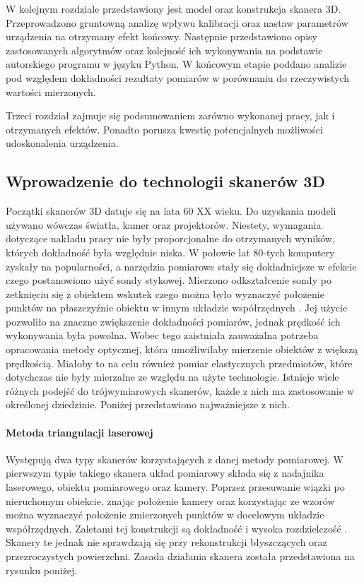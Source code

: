 \documentclass[10pt,twoside]{article}
\begin{document}
W kolejnym rozdziale przedstawiony jest model oraz konstrukcja skanera 3D. Przeprowadzono gruntowną analizę wpływu kalibracji oraz nastaw parametrów urządzenia na otrzymany efekt końcowy. Następnie przedstawiono opisy zastosowanych algorytmów oraz kolejność ich wykonywania na podstawie autorskiego programu w języku Python. W końcowym etapie poddano analizie pod względem dokładności rezultaty pomiarów w porównaniu do rzeczywistych wartości mierzonych.

Trzeci rozdział zajmuje się podsumowaniem zarówno wykonanej pracy, jak i otrzymanych efektów. Ponadto porusza kwestię potencjalnych możliwości udoskonalenia urządzenia.

\subsection{Wprowadzenie do technologii skanerów 3D}

Początki skanerów 3D datuje się na lata 60 XX wieku. Do uzyskania modeli używano wówczas światła, kamer oraz projektorów. Niestety, wymagania dotyczące nakładu pracy nie były proporcjonalne do otrzymanych wyników, których dokładność była względnie niska. W połowie lat 80-tych komputery zyskały na popularności, a narzędzia pomiarowe stały się dokładniejsze w efekcie czego postanowiono użyć sondy stykowej. Mierzono odkształcenie sondy po zetknięciu się z obiektem wskutek czego można było wyznaczyć położenie punktów na płaszczyźnie obiektu w innym układzie współrzędnych \cite{abdel20113d}. Jej użycie pozwoliło na znaczne zwiększenie dokładności pomiarów, jednak prędkość ich wykonywania była powolna. Wobec tego zaistniała zauważalna potrzeba opracowania metody optycznej, która umożliwiłaby mierzenie obiektów z większą prędkością. Miałoby to na celu również pomiar elastycznych przedmiotów, które dotychczas nie były mierzalne ze względu na użyte technologie. Istnieje wiele różnych podejść do trójwymiarowych skanerów, każde z nich ma zastosowanie w określonej dziedzinie. Poniżej przedstawiono najważniejsze z nich.

\paragraph{Metoda triangulacji laserowej\newline}
Występują dwa typy skanerów korzystających z danej metody pomiarowej. W pierwszym typie takiego skanera układ pomiarowy składa się z nadajnika laserowego, obiektu pomiarowego oraz kamery. Poprzez przesuwanie wiązki po nieruchomym obiekcie, znając położenie kamery oraz korzystając ze wzorów \cite{mikulski2013metody} można wyznaczyć położenie zmierzonych punktów w docelowym układzie współrzędnych. Zaletami tej konstrukcji są dokładność i wysoka rozdzielczość \cite{nowacki2018pomiar}. Skanery te jednak nie sprawdzają się przy rekonstrukcji błyszczących oraz przezroczystych powierzchni. Zasada działania skanera została przedstawiona na rysunku poniżej.
\end{document}
